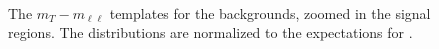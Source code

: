\begin{figure}[!hbtp]
{}
\\

\caption{The $m_T-m_{\ell\ell}$ templates for the backgrounds, zoomed in 
the signal regions. The distributions are 
normalized to the expectations for \intlumiEightTeV.}
\label{fig:mtvsmll_bkg}
\end{figure}
